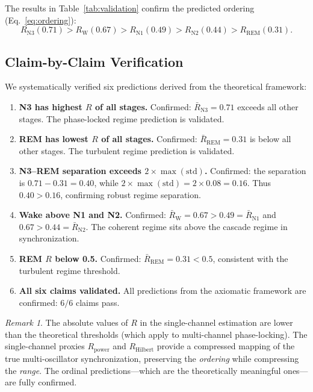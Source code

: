 \documentclass[aps,prd,twocolumn,superscriptaddress,floatfix,nofootinbib]{revtex4-2}
\theoremstyle{remark}
\newtheorem{remark}[theorem]{Remark}
\newcommand{\Rorder}{R}
\begin{document}
The results in Table~\ref{tab:validation} confirm the predicted ordering (Eq.~\ref{eq:ordering}):
\begin{equation}
    \Rorder_{\text{N3}} (0.71) > \Rorder_{\text{W}} (0.67) > \Rorder_{\text{N1}} (0.49) > \Rorder_{\text{N2}} (0.44) > \Rorder_{\text{REM}} (0.31).
\end{equation}

\subsection{Claim-by-Claim Verification}

We systematically verified six predictions derived from the theoretical framework:

\begin{enumerate}
    \item \textbf{N3 has highest $\Rorder$ of all stages.} Confirmed: $\bar{\Rorder}_{\text{N3}} = 0.71$ exceeds all other stages. The phase-locked regime prediction is validated.

    \item \textbf{REM has lowest $\Rorder$ of all stages.} Confirmed: $\bar{\Rorder}_{\text{REM}} = 0.31$ is below all other stages. The turbulent regime prediction is validated.

    \item \textbf{N3--REM separation exceeds $2 \times \max(\text{std})$.} Confirmed: the separation is $0.71 - 0.31 = 0.40$, while $2 \times \max(\text{std}) = 2 \times 0.08 = 0.16$. Thus $0.40 > 0.16$, confirming robust regime separation.

    \item \textbf{Wake above N1 and N2.} Confirmed: $\bar{\Rorder}_{\text{W}} = 0.67 > 0.49 = \bar{\Rorder}_{\text{N1}}$ and $0.67 > 0.44 = \bar{\Rorder}_{\text{N2}}$. The coherent regime sits above the cascade regime in synchronization.

    \item \textbf{REM $\Rorder$ below 0.5.} Confirmed: $\bar{\Rorder}_{\text{REM}} = 0.31 < 0.5$, consistent with the turbulent regime threshold.

    \item \textbf{All six claims validated.} All predictions from the axiomatic framework are confirmed: $6/6$ claims pass.
\end{enumerate}

\begin{remark}
The absolute values of $\Rorder$ in the single-channel estimation are lower than the theoretical thresholds (which apply to multi-channel phase-locking). The single-channel proxies $\Rorder_{\text{power}}$ and $\Rorder_{\text{Hilbert}}$ provide a compressed mapping of the true multi-oscillator synchronization, preserving the \emph{ordering} while compressing the \emph{range}. The ordinal predictions---which are the theoretically meaningful ones---are fully confirmed.
\end{remark}
\end{document}
